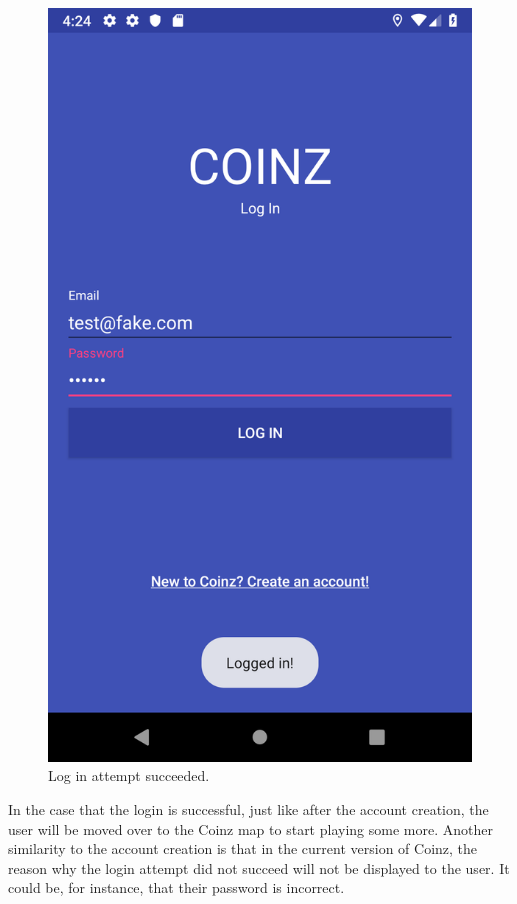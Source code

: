 \documentclass[11pt,a4paper,notitlepage]{article}
\begin{document}
\begin{figure}[H]
\begin{minipage}[t]{0.48\textwidth}
        \includegraphics[scale=0.2]{screenshots/log-in/log-in-succeeded.png}
        \caption{Log in attempt succeeded.}
    \end{minipage}
\end{figure}

    In the case that the login is successful, just like after the account creation, the user will be moved over to the Coinz map to start playing some more. Another similarity to the account creation is that in the current version of Coinz, the reason why the login attempt did not succeed will not be displayed to the user. It could be, for instance, that their password is incorrect.
\end{document}
